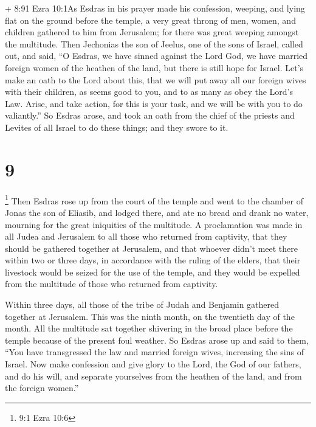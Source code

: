  + 8:91 Ezra 10:1As Esdras in his prayer made his
confession, weeping, and lying flat on the ground before the temple, a
very great throng of men, women, and children gathered to him from
Jerusalem; for there was great weeping amongst the multitude.
 Then Jechonias the son of Jeelus, one of the sons of
Israel, called out, and said, ``O Esdras, we have sinned against the
Lord God, we have married foreign women of the heathen of the land, but
there is still hope for Israel.  Let's make an oath to the
Lord about this, that we will put away all our foreign wives with their
children,  as seems good to you, and to as many as obey the
Lord's Law.  Arise, and take action, for this is your task,
and we will be with you to do valiantly.''  So Esdras
arose, and took an oath from the chief of the priests and Levites of all
Israel to do these things; and they swore to it.

\hypertarget{section-8}{%
\section{9}\label{section-8}}

 \footnote{9:1 Ezra 10:6} Then Esdras rose up from the court
of the temple and went to the chamber of Jonas the son of Eliasib,
 and lodged there, and ate no bread and drank no water,
mourning for the great iniquities of the multitude.  A
proclamation was made in all Judea and Jerusalem to all those who
returned from captivity, that they should be gathered together at
Jerusalem,  and that whoever didn't meet there within two or
three days, in accordance with the ruling of the elders, that their
livestock would be seized for the use of the temple, and they would be
expelled from the multitude of those who returned from captivity.

 Within three days, all those of the tribe of Judah and
Benjamin gathered together at Jerusalem. This was the ninth month, on
the twentieth day of the month.  All the multitude sat
together shivering in the broad place before the temple because of the
present foul weather.  So Esdras arose up and said to them,
``You have transgressed the law and married foreign wives, increasing
the sins of Israel.  Now make confession and give glory to
the Lord, the God of our fathers,  and do his will, and
separate yourselves from the heathen of the land, and from the foreign
women.''

